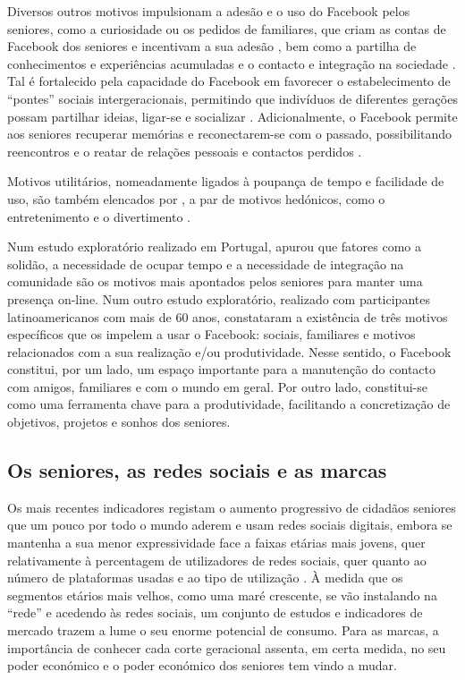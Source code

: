 \documentclass[portuguese]{textolivre}
\begin{document}
Diversos outros motivos impulsionam a adesão e o uso do Facebook pelos seniores, como a curiosidade ou os pedidos de familiares, que criam as contas de Facebook dos seniores e incentivam a sua adesão \cite{jung2001}, bem como a partilha de conhecimentos e experiências acumuladas \cite{bell2013} e o contacto e integração na sociedade \cite{lin2013}. Tal é fortalecido pela capacidade do Facebook em favorecer o estabelecimento de “pontes” sociais intergeracionais, permitindo que indivíduos de diferentes gerações possam partilhar ideias, ligar-se e socializar \cite{jung2001}. Adicionalmente, o Facebook permite aos seniores recuperar memórias e reconectarem-se com o passado, possibilitando reencontros e o reatar de relações pessoais e contactos perdidos \cite{rebelo2015, miranda2020}.

Motivos utilitários, nomeadamente ligados à poupança de tempo e facilidade de uso, são também elencados por \textcite{chopik2016}, a par de motivos hedónicos, como o entretenimento e o divertimento \cite{leist2013, ramirez-correa2019}.

Num estudo exploratório realizado em Portugal, \textcite{rebelo2015} apurou que fatores como a solidão, a necessidade de ocupar tempo e a necessidade de integração na comunidade são os motivos mais apontados pelos seniores para manter uma presença on-line. Num outro estudo exploratório, realizado com participantes latinoamericanos com mais de 60 anos, \textcite{morales2016} constataram a existência de três motivos específicos que os impelem a usar o Facebook: sociais, familiares e motivos relacionados com a sua realização e/ou produtividade. Nesse sentido, o Facebook constitui, por um lado, um espaço importante para a manutenção do contacto com amigos, familiares e com o mundo em geral. Por outro lado, constitui-se como uma ferramenta chave para a produtividade, facilitando a concretização de objetivos, projetos e sonhos dos seniores.

\subsection{Os seniores, as redes sociais e as marcas}
Os mais recentes indicadores registam o aumento progressivo de cidadãos seniores que um pouco por todo o mundo aderem e usam redes sociais digitais, embora se mantenha a sua menor expressividade face a faixas etárias mais jovens, quer relativamente à percentagem de utilizadores de redes sociais, quer quanto ao número de plataformas usadas e ao tipo de utilização \cite{eurostat2019, pew2019, statista2020}. À medida que os segmentos etários mais velhos, como uma maré crescente, se vão instalando na “rede” e acedendo às redes sociais, um conjunto de estudos e indicadores de mercado trazem a lume o seu enorme potencial de consumo. Para as marcas, a importância de conhecer cada corte geracional assenta, em certa medida, no seu poder económico e o poder económico dos seniores tem vindo a mudar.
\end{document}

